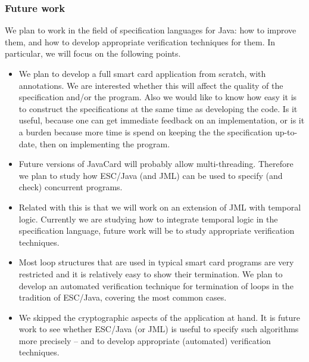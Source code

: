 \documentclass[a4paper]{llncs}
\begin{document}
\subsubsection{Future work} We plan to work in the field of
specification languages for Java: how to improve them, and how to
develop appropriate verification techniques for them. In particular,
we will focus on the following points.
\begin{itemize}
\item We plan to develop a full smart card application from scratch, with
annotations. We are interested whether this will affect the quality of 
the specification and/or the program. Also we would like to know how
easy it is to construct the specifications at the same time as
developing the code. Is it useful, because one can get immediate
feedback on an implementation, or is it a burden because more time
is spend on keeping the the specification up-to-date, then on
implementing the program.
\item Future versions of JavaCard will probably allow
multi-threading. Therefore we plan to study how ESC/Java (and JML)
can be used to specify (and check) concurrent programs.
\item Related with this is that we will work on an extension of JML with
temporal logic. Currently we are studying how to integrate temporal
logic in the specification language, future work will be to study
appropriate verification techniques.
\item Most loop structures that are used in typical smart card
programs are very restricted and it is relatively easy to show their
termination. We plan to develop an automated verification technique for
termination of loops in the tradition of ESC/Java, covering the most
common cases.
\item We skipped the cryptographic aspects of the application at
hand. It is future work to see whether ESC/Java (or JML) is useful to
specify such algorithms more precisely -- and to develop appropriate
(automated) verification techniques.
\end{itemize}



\end{document}
